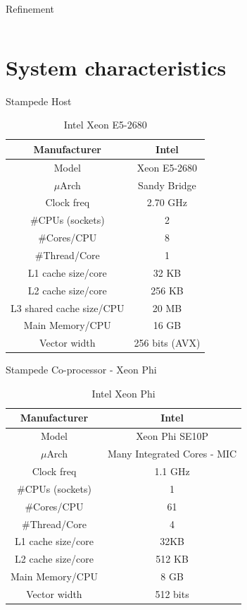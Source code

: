 \documentclass{beamer}
\begin{document}
\begin{frame}{Refinement}
\begin{columns}[c]
  \end{columns}

\end{frame}




\section{System characteristics}

\begin{frame}{Stampede Host}
\begin{table}[H]
\centering
\footnotesize
\begin{tabular}{| c | c |}\hline
Manufacturer & Intel\\ \hline
Model & Xeon E5-2680\\ \hline
$\mu$Arch & Sandy Bridge\\ \hline
Clock freq & 2.70 GHz\\ \hline
\#CPUs (sockets) & 2 \\ \hline
\#Cores/CPU & 8\\ \hline
\#Thread/Core & 1\\ \hline
L1 cache size/core & 32 KB\\ \hline
L2 cache size/core & 256 KB\\ \hline
L3 shared cache size/CPU & 20 MB\\ \hline
Main Memory/CPU & 16 GB\\ \hline
Vector width & 256 bits (AVX)\\ \hline
\end{tabular}
\caption{Intel Xeon E5-2680}
\end{table}
\end{frame}


\begin{frame}{Stampede Co-processor - Xeon Phi}
\begin{table}[H]
\centering
\footnotesize
\begin{tabular}{| c | c |}\hline
Manufacturer & Intel\\ \hline
Model & Xeon Phi SE10P\\ \hline
$\mu$Arch & Many Integrated Cores - MIC\\ \hline
Clock freq & 1.1 GHz\\ \hline
\#CPUs (sockets) & 1 \\ \hline
\#Cores/CPU & 61\\ \hline
\#Thread/Core & 4\\ \hline
L1 cache size/core & 32KB\\ \hline
L2 cache size/core & 512 KB\\ \hline
Main Memory/CPU & 8 GB\\ \hline
Vector width & 512 bits\\ \hline
\end{tabular}
\caption{Intel Xeon Phi}
\end{table}
\end{frame}
\end{document}
